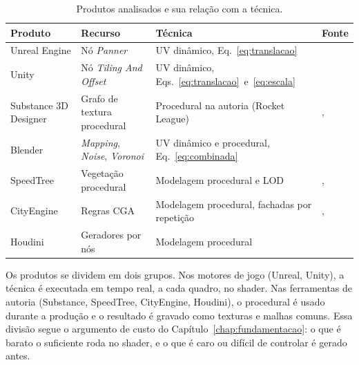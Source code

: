 \begin{table}[H]
\centering
\caption{Produtos analisados e sua relação com a técnica.}
\label{tab:aplicacoes}
\small
\begin{tabular}{p{3.0cm}p{3.6cm}p{4.0cm}p{3.4cm}}
\toprule
\textbf{Produto} & \textbf{Recurso} & \textbf{Técnica} & \textbf{Fonte} \\
\midrule
Unreal Engine & Nó \textit{Panner} & UV dinâmico, Eq.~\eqref{eq:translacao} & \cite{unrealpanner} \\
Unity & Nó \textit{Tiling And Offset} & UV dinâmico, Eqs.~\eqref{eq:translacao}~e~\eqref{eq:escala} & \cite{unitytiling} \\
Substance 3D Designer & Grafo de textura procedural & Procedural na autoria (Rocket League) & \cite{substance}, \cite[p.~14]{smelik2014} \\
Blender & \textit{Mapping}, \textit{Noise}, \textit{Voronoi} & UV dinâmico e procedural, Eq.~\eqref{eq:combinada} & \cite{blendermapping,blendernoise,blendervoronoi} \\
SpeedTree & Vegetação procedural & Modelagem procedural e LOD & \cite{speedtree}, \cite[p.~11]{smelik2014} \\
CityEngine & Regras CGA & Modelagem procedural, fachadas por repetição & \cite{cityengine}, \cite[p.~12]{smelik2014} \\
Houdini & Geradores por nós & Modelagem procedural & \cite[p.~12]{smelik2014} \\
\bottomrule
\end{tabular}
\end{table}

Os produtos se dividem em dois grupos. Nos motores de jogo (Unreal, Unity), a técnica é executada em tempo real, a cada quadro, no shader. Nas ferramentas de autoria (Substance, SpeedTree, CityEngine, Houdini), o procedural é usado durante a produção e o resultado é gravado como texturas e malhas comuns. Essa divisão segue o argumento de custo do Capítulo~\ref{chap:fundamentacao}: o que é barato o suficiente roda no shader, e o que é caro ou difícil de controlar é gerado antes.
